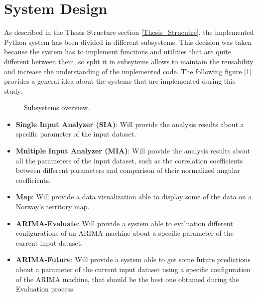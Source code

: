 \newpage

\section{System Design}
\label{System_Design}
As described in the Thesis Structure section \ref{Thesis_Strucutre}, the implemented Python system has been divided in different subsystems. This decision was taken because the system has to implement functions and utilities that are quite different between them, so split it in subsytems allows to maintain the reusability and increase the understanding of the implemented code.
The following figure [\ref{fig: Subsystems_Overview}] provides a general idea about the systems that are implemented during this study.\\

\begin{figure}[h]
    \caption[Subsystems overview]{Subsystems overview.}
    \label{fig: Subsystems_Overview}
\end{figure}


\begin{itemize}
 \item \textbf{Single Input Analyzer (SIA)}: Will provide the analysis results about a specific parameter of the input dataset.
 \item \textbf{Multiple Input Analyzer (MIA)}: Will provide the analysis results about all the parameters of the input dataset, such as the correlation coefficients between different parameters and comparison of their normalized angular coefficients. 
 \item \textbf{Map}: Will provide a data visualization able to display some of the data on a Norway's territory map.
 \item \textbf{ARIMA-Evaluate}: Will provide a system able to evaluation different configurations of an ARIMA machine about a specific parameter of the current input dataset.
 \item \textbf{ARIMA-Future}: Will provide a system able to get some future predictions about a parameter of the current input dataset using a specific configuration of the ARIMA machine, that should be the best one obtained during the Evaluation process.
\end{itemize} 



